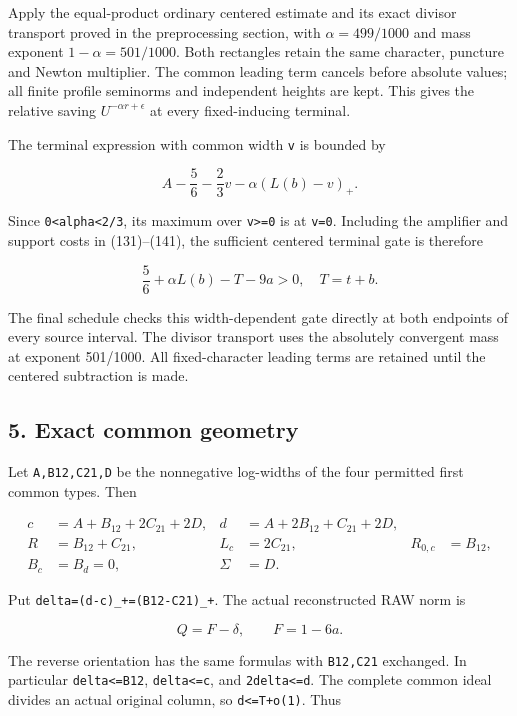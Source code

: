 Apply the equal-product ordinary centered estimate and its exact divisor transport proved in the preprocessing section, with \(\alpha=499/1000\) and mass exponent \(1-\alpha=501/1000\). Both rectangles retain the same character, puncture and Newton multiplier. The common leading term cancels before absolute values; all finite profile seminorms and independent heights are kept. This gives the relative saving \(U^{-\alpha r+\epsilon}\) at every fixed-inducing terminal.

The terminal expression with common width \texttt{v} is bounded by

\[
 A-\frac56-\frac23v-\alpha(L(b)-v)_+.
\]

Since \texttt{0\textless{}alpha\textless{}2/3}, its maximum over \texttt{v\textgreater{}=0} is at \texttt{v=0}. Including the amplifier and support costs in (131)--(141), the sufficient centered terminal gate is therefore

\[
 \boxed{\quad \frac56+\alpha L(b)-T-9a>0,\quad T=t+b.\quad}
\tag{G5}
\]

The final schedule checks this width-dependent gate directly at both endpoints of every source interval. The divisor transport uses the absolutely convergent mass at exponent 501/1000. All fixed-character leading terms are retained until the centered subtraction is made.

\hypertarget{sources:exact-common-geometry}{%
\subsection{5. Exact common geometry}\label{sources:exact-common-geometry}}

Let \texttt{A,B12,C21,D} be the nonnegative log-widths of the four permitted first common types. Then

\[
 \begin{aligned}
 c&=A+B_{12}+2C_{21}+2D,&
 d&=A+2B_{12}+C_{21}+2D,\\
 R&=B_{12}+C_{21},&
 L_c&=2C_{21},&R_{0,c}&=B_{12},\\
 B_c&=B_d=0,&\Sigma&=D.
 \end{aligned}
\tag{G6}
\]

Put \texttt{delta=(d-c)\_+=(B12-C21)\_+}. The actual reconstructed RAW norm is

\[
 Q=F-\delta,\qquad F=1-6a.
\tag{G7}
\]

The reverse orientation has the same formulas with \texttt{B12,C21} exchanged. In particular \texttt{delta\textless{}=B12}, \texttt{delta\textless{}=c}, and \texttt{2delta\textless{}=d}. The complete common ideal divides an actual original column, so \texttt{d\textless{}=T+o(1)}. Thus

